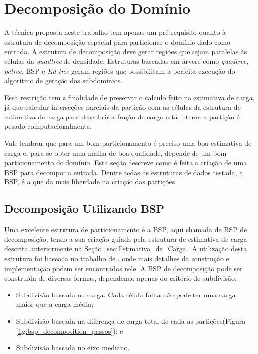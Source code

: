 \section{Decomposição do Domínio}\label{sec:Decomposicao_dominio}

A técnica proposta neste trabalho tem apenas um pré-requisito quanto à estrutura de decomposição espacial para particionar o domínio dado como entrada. A estrutura de decomposição deve gerar regiões que sejam paralelas às células da \textit{quadtree} de densidade. Estruturas baseadas em árvore como \textit{quadtree}, \textit{octree}, BSP e \textit{Kd-tree} geram regiões que possibilitam a perfeita execução do algoritmo de geração dos subdomínios.

Essa restrição tem a finalidade de preservar o calculo feito na estimativa de carga, já que calcular interseções parciais da partição com as células da estrutura de estimativa de carga para descobrir a fração de carga está interna a partição é pesado computacionalmente.

Vale lembrar que para um bom particionamento é preciso uma boa estimativa de carga e, para se obter uma malha de boa qualidade, depende de um bom particionamento do domínio. Esta seção descreve como é feita a criação de uma BSP para decompor a entrada. Dentre todas as estruturas de dados testada, a BSP, é a que da mais liberdade na criação das partições


\subsection{Decomposição Utilizando BSP}

Uma excelente estrutura de particionamento é a BSP, aqui chamada de BSP de decomposição, tendo a sua criação guiada pela estrutura de estimativa de carga descrita anteriormente na Seção~\ref{sec:Estimativa_de_Carga}. A utilização desta estrutura foi baseada no trabalho de \cite{bib:RepMarkos13}, onde mais detalhes da construção e implementação podem ser encontrados nele. A BSP de decomposição pode ser construída de diversas formas, dependendo apenas do critério de subdivisão:


\begin{itemize}
	\item Subdivisão baseada na carga. Cada célula folha não pode ter uma carga maior que a carga média;
	\item Subdivisão baseada na diferença de carga total de cada as partições(Figura \ref{fig:bsp_decomposition_passos}); e 
	\item Subdivisão baseada no eixo mediano.
\end{itemize}


